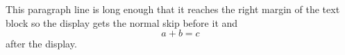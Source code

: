 \documentclass[10pt]{article}
\begin{document}
This paragraph line is long enough that it reaches the right margin of the text block so the display gets the normal skip before it and
\[ a + b = c \]
after the display.
\end{document}
